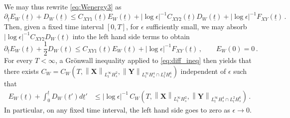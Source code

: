 \documentclass[11pt,reqno]{amsart}
\newcommand{\X}{\bm{X}}
\newcommand{\Y}{\bm{Y}}
\newcommand{\p}{\partial}
\newcommand{\abs}[1]{\left\lvert #1 \right\rvert}
\newcommand{\norm}[1]{\left\lVert #1 \right\rVert}
\numberwithin{equation}{section}
\theoremstyle{definition}
\begin{document}
We may thus rewrite \eqref{eq:Wenergy3} as 
\begin{equation}
  \p_{\underline{t}} E_W(\underline{t}) + D_W(\underline{t})
  \le C_{XY1}(\underline{t}) E_W(\underline{t}) + \abs{\log\epsilon}^{-1}C_{XY2}(\underline{t})D_W(\underline{t}) + \abs{\log\epsilon}^{-1}F_{XY}(\underline{t})\,.
\end{equation}
%
Then, given a fixed time interval $[0,T]$, for $\epsilon$ sufficiently small, we may absorb $\abs{\log\epsilon}^{-1}C_{XY2}D_W(\underline{t})$ into the left hand side terms to obtain 
\begin{equation}\label{eq:diff_ineq}
  \p_{\underline{t}} E_W(\underline{t}) + \frac{1}{2}D_W(\underline{t})
  \le C_{XY1}(\underline{t}) E_W(\underline{t})  + \abs{\log\epsilon}^{-1}F_{XY}(\underline{t})\,,
  \qquad E_W(0)=0\,.
\end{equation}
%
For every $T<\infty$, a Gr\"onwall inequality applied to \eqref{eq:diff_ineq} then yields that there exists $C_W=C_W(T,\norm{\X}_{L^\infty_tH^2_s},\norm{\Y}_{L^\infty_tH^4_s\cap L^2_tH^6_s})$ independent of $\epsilon$ such that  
\begin{equation}\label{eq:EW_DW}
\begin{aligned}
  E_W(\underline{t})+ \int_0^{\underline{t}}D_W(\underline{t}')d\underline{t}' &\le \abs{\log\epsilon}^{-1} \,C_W(T,\norm{\X}_{L^\infty_tH^2_s},\norm{\Y}_{L^\infty_tH^4_s\cap L^2_tH^6_s}) \,.
\end{aligned}
\end{equation}
In particular, on any fixed time interval, the left hand side goes to zero as $\epsilon\to 0$. 
\end{document}
